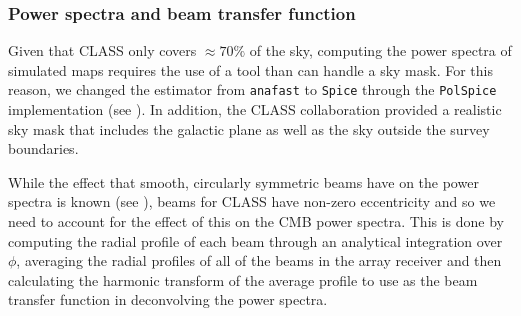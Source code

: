 \documentclass[a4paper,11pt]{article}
\begin{document}
\subsubsection{Power spectra and beam transfer function}

Given that CLASS only covers $\approx 70\%$ of the sky, computing the power spectra of simulated maps requires the use of a tool than can handle a sky mask. For this reason, we changed the estimator from \texttt{anafast} to \texttt{Spice} through the \texttt{PolSpice} implementation (see \cite{2004MNRAS.350..914C}). In addition, the CLASS collaboration provided a realistic sky mask that includes the galactic plane as well as the sky outside the survey boundaries.

While the effect that smooth, circularly symmetric beams have on the power spectra is known (see \cite{2003ApJS..148...39P}), beams for CLASS have non-zero eccentricity and so we need to account for the effect of this on the CMB power spectra. This is done by computing the radial profile of each beam through an analytical integration over $\phi$, averaging the radial profiles of all of the beams in the array receiver and then calculating the harmonic transform of the average profile to use as the beam transfer function in deconvolving the power spectra.


\end{document}

